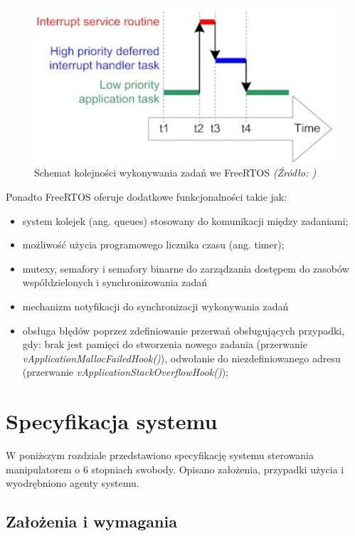 \documentclass[a4paper, 12pt, twoside]{article}
\begin{document}
\begin{figure}[hbt!]
\centering
\includegraphics[width=0.8\linewidth]{images/freertos_scheduler.png}
\caption{Schemat kolejności wykonywania zadań we FreeRTOS \textit{ (Źródło: \cite{freertos}) } }
\label{fig:freertos_scheduler}
\end{figure}

Ponadto FreeRTOS oferuje dodatkowe funkcjonalności takie jak:

\begin{itemize}
\item system kolejek (ang. queues) stosowany do komunikacji między zadaniami;
\item możliwość użycia programowego licznika czasu (ang. timer);
\item mutexy, semafory i semafory binarne do zarządzania dostępem do zasobów współdzielonych i synchronizowania zadań
\item mechanizm notyfikacji do synchronizacji wykonywania zadań
\item obsługa błędów poprzez zdefiniowanie przerwań obsługujących przypadki, gdy: brak jest pamięci do stworzenia nowego zadania (przerwanie \textit{vApplicationMallocFailedHook()}), odwołanie do niezdefiniowanego adresu (przerwanie \textit{vApplicationStackOverflowHook()});
\end{itemize}

\newpage
\vspace*{1.5 cm}
\section{Specyfikacja systemu} \label{system_arch}
\vspace{1.5 cm}
W poniższym rozdziale przedstawiono specyfikację systemu sterowania manipulatorem o 6 stopniach swobody. Opisano założenia, przypadki użycia i wyodrębniono agenty systemu.
\subsection{Założenia i wymagania}
\end{document}
